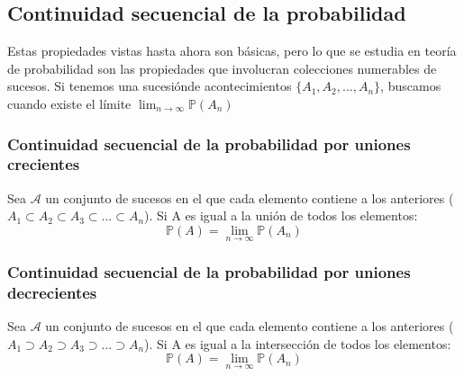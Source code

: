 \documentclass[11pt]{article}
\newcommand{\prob}{\mathbb{P}}
\theoremstyle{plain}
\begin{document}
            \subsection{Continuidad secuencial de la probabilidad} %
            \label{sub:continuidad_secuencial_de_la_probabilidad}
                Estas propiedades vistas hasta ahora son básicas, pero lo que se estudia en teoría de probabilidad son las propiedades que involucran colecciones numerables de sucesos. Si tenemos una sucesiónde acontecimientos $\{A_1,A_2,...,A_n\}$, buscamos cuando existe el límite 
                $\lim_{n \to \infty} \mathbb{P}(A_n)$
                \subsubsection{Continuidad secuencial de la probabilidad por uniones crecientes} %
                \label{subsub:continuidad_secuencial_de_la_probabilidad_por_uniones_crecientes}
                    Sea $\mathcal{A}$ un conjunto de sucesos en el que cada elemento contiene a los anteriores ($A_1 \subset A_2 \subset A_3 \subset ... \subset A_n$). Si A es igual a la unión de todos los elementos:
                    \begin{equation}
                        \prob (A) = \lim_{n\to\infty} \prob (A_n)
                    \end{equation}
                \subsubsection{Continuidad secuencial de la probabilidad por uniones decrecientes} %
                \label{subsub:continuidad_secuencial_de_la_probabilidad_por_uniones_decrecientes}
                    Sea $\mathcal{A}$ un conjunto de sucesos en el que cada elemento contiene a los anteriores ($A_1 \supset A_2 \supset A_3 \supset ... \supset A_n$). Si A es igual a la intersección de todos los elementos:
                    \begin{equation}
                        \prob (A) = \lim_{n\to\infty} \prob (A_n)
                    \end{equation}

\end{document}
